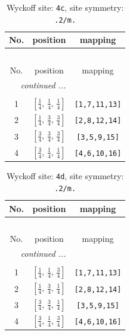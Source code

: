 \documentclass[fleqn,8pt]{jsarticle}
\begin{document}
\renewcommand{\arraystretch}{1.2}
\begin{longtable}{ccc}
\caption{Wyckoff site: {\tt 4c}, site symmetry: {\tt .2/m.}}
 \\
 \hline \hline
No. & position & mapping \\ \hline \endfirsthead

\multicolumn{2}{l}{\tablename\ \thetable{}} \\
 \hline \hline
No. & position & mapping \\ \hline \endhead

 \hline \hline
\multicolumn{2}{r}{\footnotesize\it continued ...} \\ \endfoot

 \hline \hline
\multicolumn{2}{r}{} \\ \endlastfoot

1 & $\left[ \frac{1}{4},\, \frac{1}{4},\, \frac{1}{4} \right]$ & {\tt [1,7,11,13]} \\ \hline
2 & $\left[ \frac{1}{4},\, \frac{3}{4},\, \frac{3}{4} \right]$ & {\tt [2,8,12,14]} \\ \hline
3 & $\left[ \frac{3}{4},\, \frac{3}{4},\, \frac{3}{4} \right]$ & {\tt [3,5,9,15]} \\ \hline
4 & $\left[ \frac{3}{4},\, \frac{1}{4},\, \frac{1}{4} \right]$ & {\tt [4,6,10,16]} \\
\end{longtable}
\renewcommand{\arraystretch}{1.2}
\begin{longtable}{ccc}
\caption{Wyckoff site: {\tt 4d}, site symmetry: {\tt .2/m.}}
 \\
 \hline \hline
No. & position & mapping \\ \hline \endfirsthead

\multicolumn{2}{l}{\tablename\ \thetable{}} \\
 \hline \hline
No. & position & mapping \\ \hline \endhead

 \hline \hline
\multicolumn{2}{r}{\footnotesize\it continued ...} \\ \endfoot

 \hline \hline
\multicolumn{2}{r}{} \\ \endlastfoot

1 & $\left[ \frac{1}{4},\, \frac{1}{4},\, \frac{3}{4} \right]$ & {\tt [1,7,11,13]} \\ \hline
2 & $\left[ \frac{1}{4},\, \frac{3}{4},\, \frac{1}{4} \right]$ & {\tt [2,8,12,14]} \\ \hline
3 & $\left[ \frac{3}{4},\, \frac{3}{4},\, \frac{1}{4} \right]$ & {\tt [3,5,9,15]} \\ \hline
4 & $\left[ \frac{3}{4},\, \frac{1}{4},\, \frac{3}{4} \right]$ & {\tt [4,6,10,16]} \\
\end{longtable}
\end{document}
